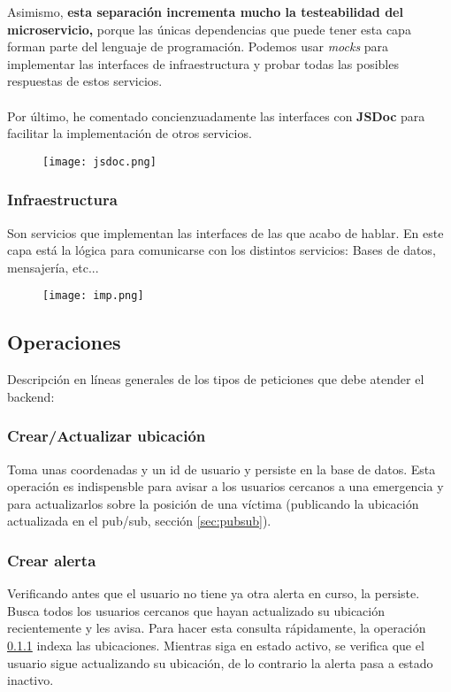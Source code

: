 Asimismo, \textbf{esta separación incrementa mucho la testeabilidad del microservicio,} porque las únicas dependencias
que puede tener esta capa forman parte del lenguaje de programación. Podemos usar \textit{mocks} para implementar
las interfaces de infraestructura y probar todas las posibles respuestas de estos servicios. \\ \\
Por último, he comentado concienzuadamente las interfaces con \textbf{JSDoc} \cite{jsdoc} para facilitar la implementación de otros servicios.
\begin{figure}[H]
	\centering	
	\texttt{[image: jsdoc.png]}
	\end{figure}

\subsubsection{Infraestructura} 
Son servicios que implementan las interfaces de las que acabo de hablar.
En este capa está la lógica para comunicarse con los distintos servicios: Bases de datos, mensajería, etc...
\begin{figure}[H]
	\centering	
	\texttt{[image: imp.png]}
	\end{figure}


\subsection{Operaciones}

Descripción en líneas generales de los tipos de peticiones que debe atender el backend:

\subsubsection{Crear/Actualizar ubicación}\label{op:ubi}
Toma unas coordenadas y un id de usuario y persiste en la base de datos.
Esta operación es indispensble para avisar a los usuarios cercanos a una emergencia y para 
actualizarlos sobre la posición de una víctima (publicando la ubicación actualizada en el pub/sub, sección \ref{sec:pubsub}).

\subsubsection{Crear alerta}
Verificando antes que el usuario no tiene ya otra alerta en curso, la persiste.
Busca todos los usuarios cercanos que hayan actualizado su ubicación recientemente y les avisa. Para hacer
esta consulta rápidamente, la operación \ref{op:ubi} indexa las ubicaciones.
Mientras siga en estado activo, se verifica que el usuario sigue actualizando su ubicación, de lo contrario la alerta pasa a estado inactivo.

